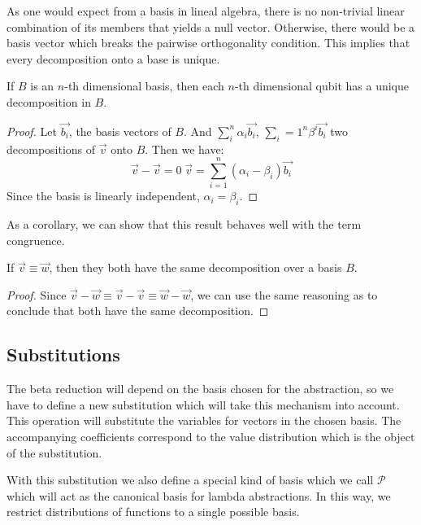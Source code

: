 \documentclass[runningheads,orivec]{llncs}
\newcommand\AbsBasis{\ensuremath{\mathcal{P}}}
\begin{document}
As one would expect from a basis in lineal algebra, there is no non-trivial linear combination of its members that yields a null vector. Otherwise, there would be a basis vector which breaks the pairwise orthogonality condition. This implies that every decomposition onto a base is unique.

\begin{proposition}\label{prop:UniqueDecomposition}
  If $B$ is an $n$-th dimensional basis, then each $n$-th dimensional qubit has a unique decomposition in $B$.
\end{proposition}

\begin{proof}
  Let $\vec{b_i}$, the basis vectors of $B$. And $\sum_i^n\alpha_i \vec{b_i}$, $\sum_i=1^n \beta^i \vec{b_i}$ two decompositions of $\vec{v}$ onto $B$. Then we have:
  \[\vec{v} - \vec{v} = 0 \; \vec{v} = \sum_{i=1}^{n} (\alpha_i - \beta_i) \vec{b_i}\]
  Since the basis is linearly independent, $\alpha_i = \beta_i$.
\end{proof}

As a corollary, we can show that this result behaves well with the term congruence.

\begin{corollary}\label{cor:EquivalentDecomposition}
  If $\vec{v}\equiv\vec{w}$, then they both have the same decomposition over a basis $B$.
\end{corollary}
\begin{proof}
  Since $\vec{v} - \vec{w} \equiv \vec{v} - \vec{v} \equiv \vec{w} - \vec{w}$, we can use the same reasoning as  to conclude that both have the same decomposition.
\end{proof}

\subsection{Substitutions}

The beta reduction will depend on the basis chosen for the abstraction, so we have to define a new substitution which will take this mechanism into account. This operation will substitute the variables for vectors in the chosen basis. The accompanying coefficients correspond to the value distribution which is the object of the substitution.
  
With this substitution we also define a special kind of basis which we call $\AbsBasis$ which will act as the canonical basis for lambda abstractions. In this way, we restrict distributions of functions to a single possible basis.
\end{document}
